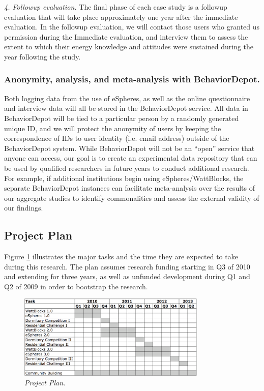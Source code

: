 {\em 4. Followup evaluation.}  The final phase of each case study
is a followup evaluation that will take place approximately one year after
the immediate evaluation.   In the followup evaluation, we will contact
those users who granted us permission during the Immediate evaluation, and
interview them to assess the extent to which their energy knowledge and
attitudes were sustained during the year following the study. 

\subsubsection{Anonymity, analysis,  and meta-analysis with BehaviorDepot.}

Both logging data from the use of eSpheres, as well as the online
questionnaire and interview data will all be stored in the BehaviorDepot
service.  All data in BehaviorDepot will be tied to a particular person by
a randomly generated unique ID, and we will protect the anonymity of users
by keeping the correspondence of IDs to user identity (i.e. email address)
outside of the BehaviorDepot system.  While BehaviorDepot will not be an
``open'' service that anyone can access, our goal is to create an
experimental data repository that can be used by qualified researchers in
future years to conduct additional research.  For example, if additional
institutions begin using eSpheres/WattBlocks, the separate BehaviorDepot
instances can facilitate meta-analysis over the results of our aggregate
studies to identify commonalities and assess the external validity of our
findings.


\subsection{Project Plan}
\label{sec:plan}

Figure \ref{fig:plan} illustrates the major tasks and the time they are
expected to take during this research.  The plan assumes research funding
starting in Q3 of 2010 and extending for three years, as well as unfunded
development during Q1 and Q2 of 2009 in order to bootstrap the
research.

\begin{figure}[th]
  \center
  \includegraphics[width=0.8\textwidth]{gantt.eps}
  \caption{\em \small Project Plan.}
 \label{fig:plan}
\end{figure} 

